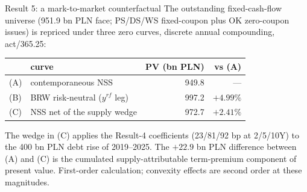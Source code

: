 \documentclass[aspectratio=169,11pt]{beamer}
\begin{document}
\begin{frame}{Result 5: a mark-to-market counterfactual}
  \small The outstanding fixed-cash-flow universe (951.9 bn PLN face; PS/DS/WS
  fixed-coupon plus OK zero-coupon issues) is repriced under three zero
  curves, discrete annual compounding, act/365.25:
  \begin{center}
  \small
  \begin{tabular}{llrr}
    & curve & PV (bn PLN) & vs (A)\\
    \hline
    (A) & contemporaneous NSS & 949.8 & ---\\
    (B) & BRW risk-neutral ($y^{rf}$ leg) & 997.2 & $+4.99\%$\\
    (C) & NSS net of the supply wedge & 972.7 & $+2.41\%$\\
  \end{tabular}
  \end{center}
  \vspace{1mm}
  The wedge in (C) applies the Result-4 coefficients (23/81/92 bp at 2/5/10Y)
  to the 400 bn PLN debt rise of 2019--2025. The $+22.9$ bn PLN difference
  between (A) and (C) is the cumulated supply-attributable term-premium
  component of present value. First-order calculation; convexity effects are
  second order at these magnitudes.
\end{frame}
\end{document}
